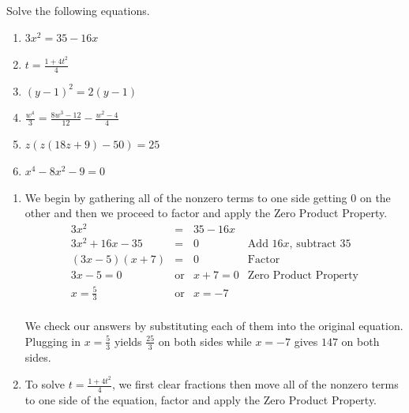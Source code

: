 \documentclass{ximera}
\begin{document}
\begin{example}\label{solveeqnbyfactoring}  Solve the following equations.


\begin{enumerate}

\item  $3x^2 = 35 - 16x$

\item  $t = \frac{1+4t^2}{4}$

\item  $(y-1)^2 = 2(y-1)$


\item  $\frac{w^4}{3} = \frac{8w^3-12}{12} - \frac{w^2-4}{4}$

\item  $z(z(18z+9)-50) = 25$

\item  $x^4-8x^2 - 9 = 0$

\end{enumerate}

\begin{explanation}

\begin{enumerate}

\item  We begin by gathering all of the nonzero terms to one side getting $0$ on the other and then we proceed to factor and apply the Zero Product Property. \[ \begin{array}{rclr}

3x^2 & = & 35 - 16x & \\

3x^2 + 16x - 35 & = & 0 & \text{Add $16x$, subtract $35$} \\

(3x-5)(x+7) & = & 0 & \text{Factor} \\

3x-5 = 0 & \text{or} & x+7 = 0 & \text{Zero Product Property} \\

x = \frac{5}{3} & \text{or} & x = -7 & \\ 

\end{array} \]

We check our answers by substituting each of them into the original equation.  Plugging in $x = \frac{5}{3}$ yields $\frac{25}{3}$ on both sides while $x = -7$ gives $147$ on both sides.

\item To solve $t = \frac{1+4t^2}{4}$, we first clear fractions then move all of the nonzero terms to one side of the equation, factor and apply the Zero Product Property.\[ \begin{array}{rclr}


\end{array}\]
\end{enumerate}
\end{explanation}
\end{example}
\end{document}
